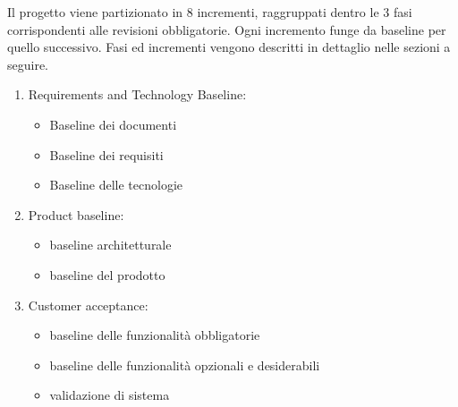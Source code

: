 Il progetto viene partizionato in 8 incrementi, raggruppati dentro le 3 fasi corrispondenti alle revisioni obbligatorie. Ogni incremento funge da baseline per quello successivo. Fasi ed incrementi vengono descritti in dettaglio nelle sezioni a seguire.
\begin{enumerate}
    \item Requirements and Technology Baseline:
    \begin{itemize} 
    \item Baseline dei documenti
    \item Baseline dei requisiti
    \item Baseline delle tecnologie
    \end{itemize}
    \item Product baseline:
    \begin{itemize} 
        \item baseline architetturale 
        \item baseline del prodotto
    \end{itemize}
    \item Customer acceptance:
    \begin{itemize}
        \item baseline delle funzionalità obbligatorie
        \item baseline delle funzionalità opzionali e desiderabili
        \item validazione di sistema 
    \end{itemize}
\end{enumerate}

